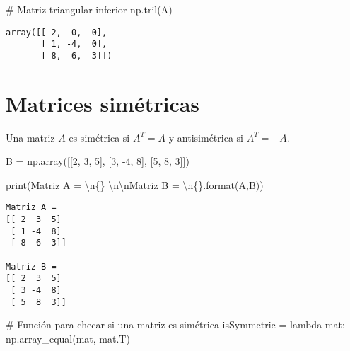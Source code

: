 \documentclass[
  letterpaper,
  DIV=11,
  numbers=noendperiod]{scrreprt}
\newenvironment{Shaded}{\begin{snugshade}}{\end{snugshade}}
\newcommand{\BuiltInTok}[1]{\textcolor[rgb]{0.00,0.23,0.31}{#1}}
\newcommand{\CharTok}[1]{\textcolor[rgb]{0.13,0.47,0.30}{#1}}
\newcommand{\CommentTok}[1]{\textcolor[rgb]{0.37,0.37,0.37}{#1}}
\newcommand{\DecValTok}[1]{\textcolor[rgb]{0.68,0.00,0.00}{#1}}
\newcommand{\KeywordTok}[1]{\textcolor[rgb]{0.00,0.23,0.31}{#1}}
\newcommand{\NormalTok}[1]{\textcolor[rgb]{0.00,0.23,0.31}{#1}}
\newcommand{\OperatorTok}[1]{\textcolor[rgb]{0.37,0.37,0.37}{#1}}
\newcommand{\SpecialCharTok}[1]{\textcolor[rgb]{0.37,0.37,0.37}{#1}}
\newcommand{\StringTok}[1]{\textcolor[rgb]{0.13,0.47,0.30}{#1}}
\begin{document}
\begin{Shaded}
\begin{Highlighting}[]
\CommentTok{\# Matriz triangular inferior}
\NormalTok{np.tril(A)}
\end{Highlighting}
\end{Shaded}

\begin{verbatim}
array([[ 2,  0,  0],
       [ 1, -4,  0],
       [ 8,  6,  3]])
\end{verbatim}

\section{Matrices simétricas}\label{matrices-simuxe9tricas}

Una matriz \(A\) es simétrica si \(A^T = A\) y antisimétrica si
\(A^T = -A\).

\begin{Shaded}
\begin{Highlighting}[]
\NormalTok{B }\OperatorTok{=}\NormalTok{ np.array([[}\DecValTok{2}\NormalTok{, }\DecValTok{3}\NormalTok{, }\DecValTok{5}\NormalTok{],}
\NormalTok{              [}\DecValTok{3}\NormalTok{, }\OperatorTok{{-}}\DecValTok{4}\NormalTok{, }\DecValTok{8}\NormalTok{],}
\NormalTok{              [}\DecValTok{5}\NormalTok{, }\DecValTok{8}\NormalTok{, }\DecValTok{3}\NormalTok{]])}
\end{Highlighting}
\end{Shaded}

\begin{Shaded}
\begin{Highlighting}[]
\BuiltInTok{print}\NormalTok{(}\StringTok{\textquotesingle{}Matriz A = }\CharTok{\textbackslash{}n}\SpecialCharTok{\{\}}\StringTok{ }\CharTok{\textbackslash{}n\textbackslash{}n}\StringTok{Matriz B = }\CharTok{\textbackslash{}n}\SpecialCharTok{\{\}}\StringTok{\textquotesingle{}}\NormalTok{.}\BuiltInTok{format}\NormalTok{(A,B))}
\end{Highlighting}
\end{Shaded}

\begin{verbatim}
Matriz A = 
[[ 2  3  5]
 [ 1 -4  8]
 [ 8  6  3]] 

Matriz B = 
[[ 2  3  5]
 [ 3 -4  8]
 [ 5  8  3]]
\end{verbatim}

\begin{Shaded}
\begin{Highlighting}[]
\CommentTok{\# Función para checar si una matriz es simétrica}
\NormalTok{isSymmetric }\OperatorTok{=} \KeywordTok{lambda}\NormalTok{ mat: np.array\_equal(mat, mat.T)}
\end{Highlighting}
\end{Shaded}
\end{document}
